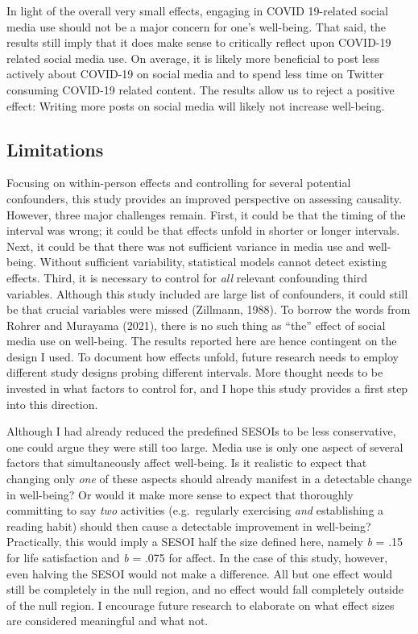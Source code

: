 \documentclass[
  man,floatsintext]{apa7}
\begin{document}
In light of the overall very small effects, engaging in COVID 19-related social media use should not be a major concern for one's well-being.
That said, the results still imply that it does make sense to critically reflect upon COVID-19 related social media use.
On average, it is likely more beneficial to post less actively about COVID-19 on social media and to spend less time on Twitter consuming COVID-19 related content.
The results allow us to reject a positive effect: Writing more posts on social media will likely not increase well-being.

\hypertarget{limitations}{%
\subsection{Limitations}\label{limitations}}

Focusing on within-person effects and controlling for several potential confounders, this study provides an improved perspective on assessing causality.
However, three major challenges remain.
First, it could be that the timing of the interval was wrong; it could be that effects unfold in shorter or longer intervals.
Next, it could be that there was not sufficient variance in media use and well-being.
Without sufficient variability, statistical models cannot detect existing effects.
Third, it is necessary to control for \emph{all} relevant confounding third variables.
Although this study included are large list of confounders, it could still be that crucial variables were missed (Zillmann, 1988).
To borrow the words from Rohrer and Murayama (2021), there is no such thing as ``the'' effect of social media use on well-being.
The results reported here are hence contingent on the design I used.
To document how effects unfold, future research needs to employ different study designs probing different intervals.
More thought needs to be invested in what factors to control for, and I hope this study provides a first step into this direction.

Although I had already reduced the predefined SESOIs to be less conservative, one could argue they were still too large.
Media use is only one aspect of several factors that simultaneously affect well-being.
Is it realistic to expect that changing only \emph{one} of these aspects should already manifest in a detectable change in well-being?
Or would it make more sense to expect that thoroughly committing to say \emph{two} activities (e.g.~regularly exercising \emph{and} establishing a reading habit) should then cause a detectable improvement in well-being?
Practically, this would imply a SESOI half the size defined here, namely \emph{b} = \textbar.15\textbar{} for life satisfaction and \emph{b} = \textbar.075\textbar{} for affect.
In the case of this study, however, even halving the SESOI would not make a difference.
All but one effect would still be completely in the null region, and no effect would fall completely outside of the null region.
I encourage future research to elaborate on what effect sizes are considered meaningful and what not.
\end{document}
